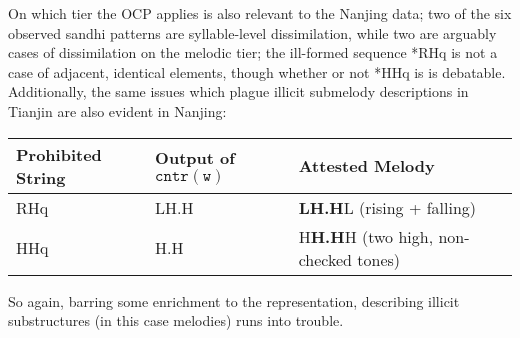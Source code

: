 \documentclass{article}
\newcommand{\C}{$\mathtt{cntr(w)}$ }
\begin{document}
On which tier the OCP applies is also relevant to the Nanjing data; two of the six observed sandhi patterns are syllable-level dissimilation, while two are arguably cases of dissimilation on the melodic tier; the ill-formed sequence *RHq is not a case of adjacent, identical elements, though whether or not *HHq is is debatable. Additionally, the same issues which plague illicit submelody descriptions in Tianjin are also evident in Nanjing:
\begin{exe}
\ex 
\begin{tabular}[t]{lll}
Prohibited String & Output of \C & Attested Melody \\
\hline
RHq & LH.H & \textbf{LH.H}L (rising + falling) \\
HHq & H.H & H\textbf{H.H}H (two high, non-checked tones)\\ 
\end{tabular}
\end{exe}
So again, barring some enrichment to the representation, describing illicit substructures (in this case melodies) runs into trouble.
\end{document}
